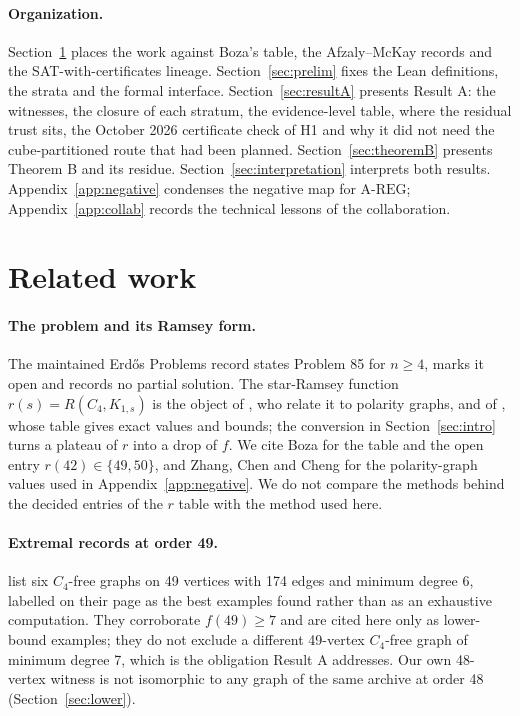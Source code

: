\documentclass{anvil-paper}
\newcommand{\AREG}{\mathrm{A\text{-}REG}}
\theoremstyle{definition}
\begin{document}
\paragraph{Organization.} Section~\ref{sec:related} places the work against Boza's table, the Afzaly--McKay records and the SAT-with-certificates lineage. Section~\ref{sec:prelim} fixes the Lean definitions, the strata and the formal interface. Section~\ref{sec:resultA} presents Result A: the witnesses, the closure of each stratum, the evidence-level table, where the residual trust sits, the October 2026 certificate check of H1 and why it did not need the cube-partitioned route that had been planned. Section~\ref{sec:theoremB} presents Theorem B and its residue. Section~\ref{sec:interpretation} interprets both results. Appendix~\ref{app:negative} condenses the negative map for $\AREG$; Appendix~\ref{app:collab} records the technical lessons of the collaboration.

\section{Related work}\label{sec:related}

\paragraph{The problem and its Ramsey form.} The maintained Erdős Problems record \citep{bloom-erdos85} states Problem 85 for $n\ge 4$, marks it open and records no partial solution. The star-Ramsey function $r(s)=R(C_4,K_{1,s})$ is the object of \citet{zhang2017polarity}, who relate it to polarity graphs, and of \citet{boza2024ramsey}, whose table gives exact values and bounds; the conversion in Section~\ref{sec:intro} turns a plateau of $r$ into a drop of $f$. We cite Boza for the table and the open entry $r(42)\in\{49,50\}$, and Zhang, Chen and Cheng for the polarity-graph values used in Appendix~\ref{app:negative}. We do not compare the methods behind the decided entries of the $r$ table with the method used here.

\paragraph{Extremal records at order 49.} \citet{afzaly-mckay-extremal} list six $C_4$-free graphs on 49 vertices with 174 edges and minimum degree 6, labelled on their page as the best examples found rather than as an exhaustive computation. They corroborate $f(49)\ge 7$ and are cited here only as lower-bound examples; they do not exclude a different 49-vertex $C_4$-free graph of minimum degree 7, which is the obligation Result A addresses. Our own 48-vertex witness is not isomorphic to any graph of the same archive at order 48 (Section~\ref{sec:lower}).
\end{document}

